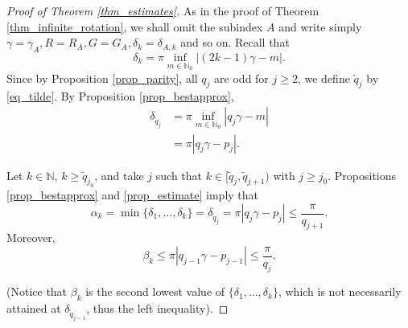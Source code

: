 \documentclass{amsart}
\def \N{\mathbb N}
\begin{document}
	\begin{proof}[Proof of Theorem \ref{thm_estimates}]
		As in the proof of Theorem \ref{thm_infinite_rotation}, we shall omit the subindex $A$ and write simply $\gamma = \gamma_A, R = R_A, G = G_A, \delta_k = \delta_{A,k}$ and so on.
		Recall that
		\[\delta_k = \pi \inf_{m \in \N_0} |(2k-1) \gamma - m|.\]
		Since by Proposition \ref{prop_parity}, all $q_j$ are odd for $j \geq 2$, we define $\tilde q_j$ by \eqref{eq_tilde}. By Proposition \ref{prop_bestapprox},
		\begin{align}
			\delta_{\tilde q_j} 
			&= \pi \inf_{m \in \N_0} |q_j \gamma - m| \\
			&= \pi |q_j \gamma - p_j|.
		\end{align}

		Let $k \in \N$, $k \geq \tilde q_{j_0}$, and take $j$ such that $k \in [\tilde q_j,\tilde  q_{j+1})$ with $j \geq j_0$.
Propositions \ref{prop_bestapprox} and \ref{prop_estimate} imply that
		\begin{equation}
		\label{eq_alpha_bound}
			\alpha_k = \min\{\delta_1, \ldots, \delta_k\} = \delta_{\tilde q_j} = \pi |q_j \gamma - p_j| \leq \frac \pi {q_{j+1}}.
		\end{equation}
		Moreover, 
		\begin{equation}
		\label{eq_beta_bound}
			\beta_k \leq \pi |q_{j-1} \gamma - p_{j-1}| \leq \frac \pi {q_j}.
		\end{equation}

		(Notice that $\beta_k$ is the second lowest value of $\{\delta_1, \ldots, \delta_k\}$, which is not necessarily attained at $\delta_{\tilde q_{j-1}}$, thus the left inequality).


\end{proof}
\end{document}
